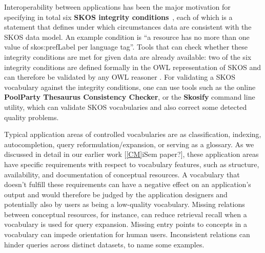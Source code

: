 


Interoperability between applications has been the major motivation for specifying in total six \textbf{SKOS integrity conditions}~\cite{Miles2005}, each of which is a statement that defines under which circumstances data are consistent with the SKOS data model. An example condition is ``a resource has no more than one value of skos:prefLabel per language tag''. Tools that can check whether these integrity conditions are met for given data are already available: two of the six integrity conditions are defined formally in the OWL representation of SKOS and can therefore be validated by any OWL reasoner . For validating a SKOS vocabulary against the integrity conditions, one can use tools such as the online \textbf{PoolParty Thesaurus Consistency Checker}, or the \textbf{Skosify} command line utility, which can validate SKOS vocabularies and also correct some detected quality problems.


Typical application areas of controlled vocabularies are as classification, indexing, autocompletion, query reformulation/expansion, or serving as a glossary. As we discussed in detail in our earlier work [\ref{CM}{iSem paper?}], these application areas have specific requirements with respect to vocabulary features, such as structure, availability, and documentation of conceptual resources. A vocabulary that doesn't fulfill these requirements can have a negative effect on an application's output and would therefore be judged by the application designers and potentially also by users as being a low-quality vocabulary. Missing relations between conceptual resources, for instance, can reduce retrieval recall when a vocabulary is used for query expansion. Missing entry points to concepts in a vocabulary can impede orientation for human users. Inconsistent relations can hinder queries across distinct datasets, to name some examples.


